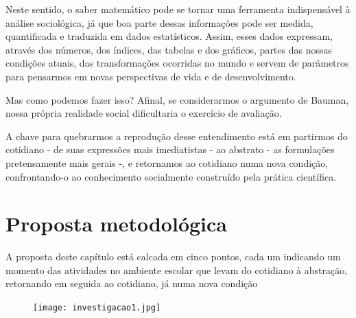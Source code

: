 Neste sentido, o saber matemático pode se tornar uma ferramenta indispensável à análise sociológica, já que boa parte dessas informações pode ser medida, quantificada e traduzida em dados estatísticos. Assim, esses dados expressam, através dos números, dos índices, das tabelas e dos gráficos, partes das nossas condições atuais, das transformações ocorridas no mundo e servem de parâmetros para pensarmos em novas perspectivas de vida e de desenvolvimento.

Mas como podemos fazer isso? Afinal, se considerarmos o argumento de Bauman, nossa própria realidade social dificultaria o exercício de avaliação.

A chave para quebrarmos a reprodução desse entendimento está em partirmos do cotidiano - de suas expressões mais imediatistas - ao abstrato - as formulações pretensamente mais gerais -, e retornamos ao cotidiano numa nova condição, confrontando-o ao conhecimento socialmente construído pela prática científica.

\section{Proposta metodológica}

A proposta deste capítulo está calcada em cinco pontos, cada um indicando um momento das atividades no ambiente escolar que levam do cotidiano à abstração, retornando em seguida ao cotidiano, já numa nova condição

\begin{figure}[H]
\centering
\texttt{[image: investigacao1.jpg]}

\end{figure}

